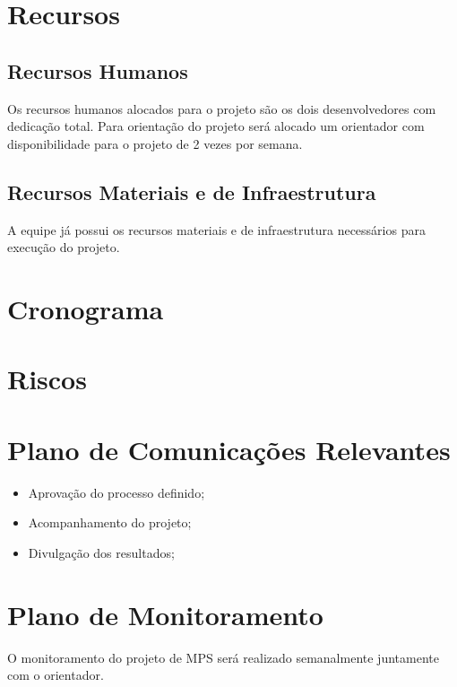 \section{Recursos}

\subsection{Recursos Humanos}

	Os recursos humanos alocados para o projeto são os dois desenvolvedores com dedicação total. Para orientação do projeto será alocado um orientador com disponibilidade para o projeto de 2 vezes por semana.


\subsection{Recursos Materiais e de Infraestrutura}

	A equipe já possui os recursos materiais e de infraestrutura necessários para execução do projeto.

\section{Cronograma}

\section{Riscos}

\section{Plano de Comunicações Relevantes}

	\begin{itemize}
		\item Aprovação do processo definido;
		\item Acompanhamento do projeto;
		\item Divulgação dos resultados;

	\end{itemize}

\section{Plano de Monitoramento}
	
	O monitoramento do projeto de MPS será realizado semanalmente juntamente com o orientador.

